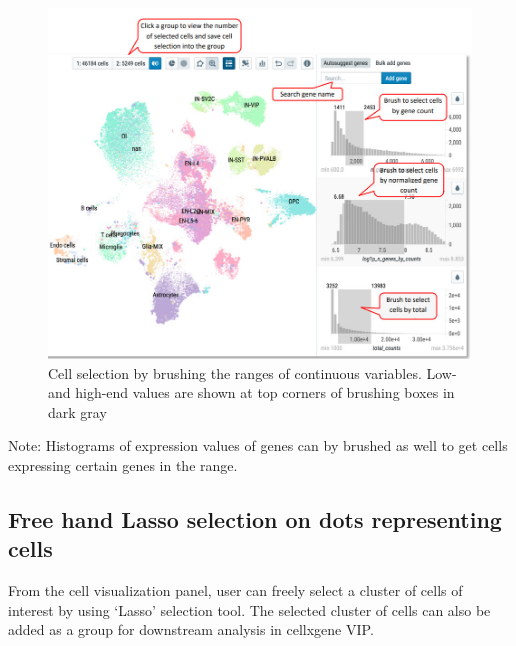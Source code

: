 \documentclass[
]{article}
\begin{document}
\begin{figure}
\centering
\includegraphics{figures/F3.jpg}
\caption{Cell selection by brushing the ranges of continuous variables. Low- and high-end values are shown at top corners of brushing boxes in dark gray}
\end{figure}

Note: Histograms of expression values of genes can by brushed as well to get cells expressing certain genes in the range.

\hypertarget{free-hand-lasso-selection-on-dots-representing-cells}{%
\subsection{Free hand Lasso selection on dots representing cells}\label{free-hand-lasso-selection-on-dots-representing-cells}}

From the cell visualization panel, user can freely select a cluster of cells of interest by using `Lasso' selection tool. The selected cluster of cells can also be added as a group for downstream analysis in cellxgene VIP.
\end{document}
